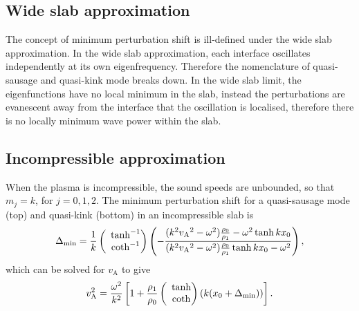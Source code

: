 \documentclass[namedreferences]{solarphysics}
\numberwithin{equation}{section}
\begin{document}
\begin{article}
\subsection{Wide slab approximation}
The concept of minimum perturbation shift is ill-defined under the wide slab approximation. In the wide slab approximation, each interface oscillates independently at its own eigenfrequency. Therefore the nomenclature of quasi-sausage and quasi-kink mode breaks down. In the wide slab limit, the eigenfunctions have no local minimum in the slab, instead the perturbations are evanescent away from the interface that the oscillation is localised, therefore there is no locally minimum wave power within the slab.


\subsection{Incompressible approximation}
When the plasma is incompressible, the sound speeds are unbounded, so that $m_j = k$, for $j = 0, 1, 2$. The minimum perturbation shift for a quasi-sausage mode (top) and quasi-kink (bottom) in an incompressible slab is
\begin{equation}
\Delta_\textrm{min} = \frac{1}{k}\left(\hspace{-0.07in}\begin{matrix} &\tanh^{-1} \\ &\coth^{-1} \end{matrix}\right)\left(-\frac{(k^2{v_\textrm{A}}^2-\omega^2)\frac{\rho_0}{\rho_1} - \omega^2\tanh{kx_0}}{(k^2{v_\textrm{A}}^2-\omega^2)\frac{\rho_0}{\rho_1}\tanh{kx_0} - \omega^2}\right),
\end{equation}
which can be solved for $v_\textrm{A}$ to give
\begin{equation}
v_\textrm{A}^2 = \frac{\omega^2}{k^2}\left[1 + \frac{\rho_1}{\rho_0}\left(\hspace{-0.07in}\begin{matrix} &\tanh \\ &\coth \end{matrix}\right)(k(x_0 + \Delta_\textrm{min}))\right].
\end{equation}



\end{article}
\end{document}
